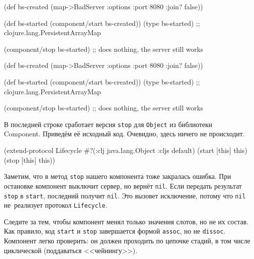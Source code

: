 \ifnarrow

\begin{english}
  \begin{clojure}
(def bs-created
  (map->BadServer
    {:options {:port 8080
               :join? false}}))

(def bs-started
   (component/start bs-created))
(type bs-started)
;; clojure.lang.PersistentArrayMap

(component/stop bs-started)
;; does nothing, the server still works
  \end{clojure}
\end{english}

\else

\begin{english}
  \begin{clojure}
(def bs-created (map->BadServer
                  {:options {:port 8080 :join? false}}))

(def bs-started (component/start bs-created))
(type bs-started)
;; clojure.lang.PersistentArrayMap

(component/stop bs-started)
;; does nothing, the server still works
  \end{clojure}
\end{english}

\fi

В последней строке сработает версия \verb|stop| для \verb|Object| из библиотеки
Component. Приведём её исходный код. Очевидно, здесь ничего не происходит.

\begin{english}
  \begin{clojure}
(extend-protocol Lifecycle
  #?(:clj java.lang.Object :cljs default)
  (start [this]
    this)
  (stop [this]
    this))
  \end{clojure}
\end{english}

Заметим, что в метод \verb|stop| нашего компонента тоже закралась ошибка. При
остановке компонент выключит сервер, но вернёт \verb|nil|. Если передать
результат \verb|stop| в \verb|start|, последний получит \verb|nil|. Это вызовет
исключение, потому что \verb|nil| не~реализует протокол \verb|Lifecycle|.


Следите за тем, чтобы компонент менял только значения слотов, но не их
состав. Как правило, код \verb|start| и \verb|stop| завершается формой
\verb|assoc|, но не \verb|dissoc|. Компонент легко проверить: он должен
проходить по цепочке стадий, в том числе циклической (поддаваться <<чейнингу>>).

